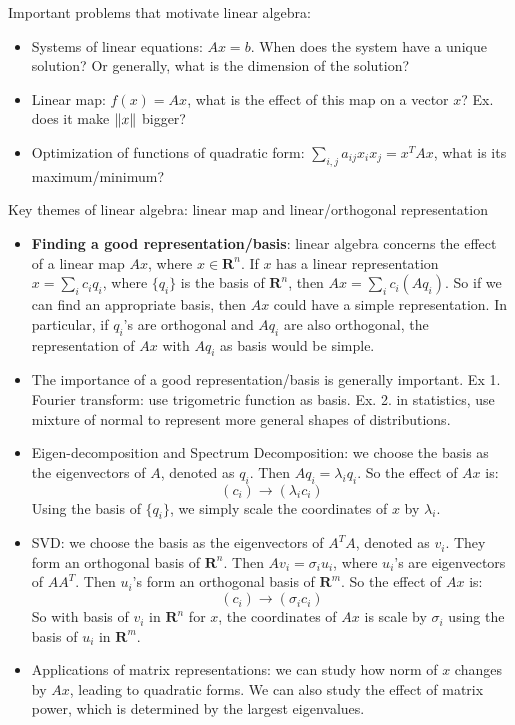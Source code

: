 \documentclass{report}
\begin{document}
Important problems that motivate linear algebra: 
\begin{itemize}
	\item Systems of linear equations: $Ax = b$. When does the system have a unique solution? Or generally, what is the dimension of the solution? 
	
	\item Linear map: $f(x) = Ax$, what is the effect of this map on a vector $x$? Ex. does it make $\lVert x\rVert$ bigger? 
	
	\item Optimization of functions of quadratic form: $\sum_{i,j} a_{ij}x_i x_j = x^T A x$, what is its maximum/minimum? 
\end{itemize}

Key themes of linear algebra: linear map and linear/orthogonal representation
\begin{itemize}
	\item \textbf{Finding a good representation/basis}: linear algebra concerns the effect of a linear map $Ax$, where $x \in \mathbf{R}^n$. If $x$ has a linear representation $x = \sum_i c_i q_i$, where $\{q_i\}$ is the basis of $\mathbf{R}^n$, then $Ax = \sum_i c_i (A q_i)$. So if we can find an appropriate basis, then $Ax$ could have a simple representation. In particular, if $q_i$'s are orthogonal and $A q_i$ are also orthogonal, the representation of $Ax$ with $A q_i$ as basis would be simple. 
	
	\item The importance of a good representation/basis is generally important. Ex 1. Fourier transform: use trigometric function as basis. Ex. 2. in statistics, use mixture of normal to represent more general shapes of distributions. 
	
	\item Eigen-decomposition and Spectrum Decomposition: we choose the basis as the eigenvectors of $A$, denoted as $q_i$. Then $A q_i = \lambda_i q_i$. So the effect of $A x$ is: 
	\begin{equation}
	(c_i) \rightarrow (\lambda_i c_i)
	\end{equation}
	Using the basis of $\{q_i\}$, we simply scale the coordinates of $x$ by $\lambda_i$. 
	
	\item SVD: we choose the basis as the eigenvectors of $A^T A$, denoted as $v_i$. They form an orthogonal basis of $\mathbf{R}^n$. Then $A v_i = \sigma_i u_i$, where $u_i$'s are eigenvectors of $A A^T$. Then $u_i$'s form an orthogonal basis of $\mathbf{R}^m$. So the effect of $A x$ is: 
	\begin{equation}
	(c_i) \rightarrow (\sigma_i c_i)
	\end{equation}
	So with basis of $v_i$ in $\mathbf{R}^n$ for $x$, the coordinates of $Ax$ is scale by $\sigma_i$ using the basis of $u_i$ in $\mathbf{R}^m$.  	
	
	\item Applications of matrix representations: we can study how norm of $x$ changes by $A x$, leading to quadratic forms. We can also study the effect of matrix power, which is determined by the largest eigenvalues.  
\end{itemize}
\end{document}
